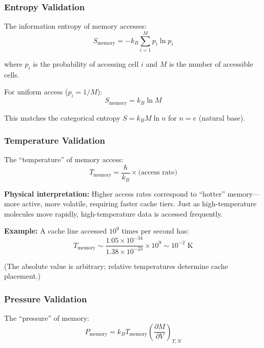 \subsubsection{Entropy Validation}

The information entropy of memory accesses:
\begin{equation}
S_{\text{memory}} = -k_B \sum_{i=1}^{M} p_i \ln p_i
\end{equation}

where $p_i$ is the probability of accessing cell $i$ and $M$ is the number of accessible cells.

For uniform access ($p_i = 1/M$):
\begin{equation}
S_{\text{memory}} = k_B \ln M
\end{equation}

This matches the categorical entropy $S = k_B M \ln n$ for $n = e$ (natural base).

\subsubsection{Temperature Validation}

The ``temperature'' of memory access:
\begin{equation}
T_{\text{memory}} = \frac{\hbar}{k_B} \times \text{(access rate)}
\end{equation}

\textbf{Physical interpretation:} Higher access rates correspond to ``hotter'' memory---more active, more volatile, requiring faster cache tiers. Just as high-temperature molecules move rapidly, high-temperature data is accessed frequently.

\textbf{Example:} A cache line accessed $10^9$ times per second has:
\begin{equation}
T_{\text{memory}} \sim \frac{1.05 \times 10^{-34}}{1.38 \times 10^{-23}} \times 10^9 \sim 10^{-2} \text{ K}
\end{equation}

(The absolute value is arbitrary; relative temperatures determine cache placement.)

\subsubsection{Pressure Validation}

The ``pressure'' of memory:
\begin{equation}
P_{\text{memory}} = k_B T_{\text{memory}} \left(\frac{\partial M}{\partial V}\right)_{T,N}
\end{equation}

